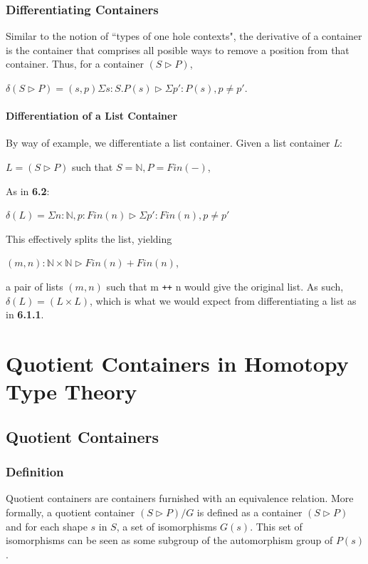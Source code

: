 \documentclass[12pt]{report}
\begin{document}
\section{Differentiating Containers}
Similar to the notion of ``types of one hole contexts", the derivative of a container is the container that comprises all posible ways to remove a position from that container.
\newpage
Thus, for a container $(S \rhd P)$,
\begin{center}
$\delta (S \rhd P) = (s,p) \Sigma s : S . P(s) \rhd \Sigma p':P(s),p \neq p'$.
\end{center}



\subsection{Differentiation of a List Container}
By way of example, we differentiate a list container. Given a list container \textit{L}:
\begin{center}
$L = (S \rhd P)$ such that $S = \mathbb{N}, P = Fin(-)$,
\end{center}
As in \textbf{6.2}:
\begin{center}
$\delta(L) = \Sigma n : \mathbb{N}, p: Fin(n) \rhd \Sigma p' : Fin(n), p \neq p'$
\end{center} 
This effectively splits the list, yielding
\begin{center}
$(m,n): \mathbb{N} \times \mathbb{N} \rhd Fin(n) + Fin(n)$,
\end{center}
a pair of lists $(m,n)$ such that m \texttt{++} n would give the original list. As such, $\delta(L) = (L \times L)$, which is what we would expect from differentiating a list as in \textbf{6.1.1}.



\part{Quotient Containers in Homotopy Type Theory}
\chapter{Quotient Containers}
\section{Definition}
Quotient containers are containers furnished with an equivalence relation. More formally, a quotient container $(S \rhd P)/G$ is defined as a container $(S \rhd P)$ and for each shape $s$ in $S$, a set of isomorphisms $G(s)$. This set of isomorphisms can be seen as some subgroup of the automorphism group of $P(s)$.
\end{document}
